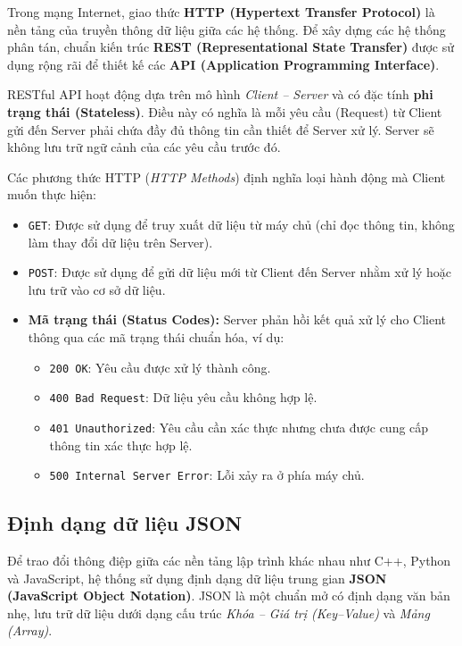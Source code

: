 \documentclass[12pt,a4paper]{report}
\begin{document}
Trong mạng Internet, giao thức \textbf{HTTP (Hypertext Transfer Protocol)} là nền tảng của truyền thông dữ liệu giữa các hệ thống. 
Để xây dựng các hệ thống phân tán, chuẩn kiến trúc \textbf{REST (Representational State Transfer)} được sử dụng rộng rãi để thiết kế các \textbf{API (Application Programming Interface)}.

RESTful API hoạt động dựa trên mô hình \textit{Client -- Server} và có đặc tính \textbf{phi trạng thái (Stateless)}. 
Điều này có nghĩa là mỗi yêu cầu (Request) từ Client gửi đến Server phải chứa đầy đủ thông tin cần thiết để Server xử lý. 
Server sẽ không lưu trữ ngữ cảnh của các yêu cầu trước đó.

Các phương thức HTTP (\textit{HTTP Methods}) định nghĩa loại hành động mà Client muốn thực hiện:

\begin{itemize}

\item \texttt{GET}: 
Được sử dụng để truy xuất dữ liệu từ máy chủ (chỉ đọc thông tin, không làm thay đổi dữ liệu trên Server).

\item \texttt{POST}: 
Được sử dụng để gửi dữ liệu mới từ Client đến Server nhằm xử lý hoặc lưu trữ vào cơ sở dữ liệu.

\item \textbf{Mã trạng thái (Status Codes):} 
Server phản hồi kết quả xử lý cho Client thông qua các mã trạng thái chuẩn hóa, ví dụ:

\begin{itemize}
\item \texttt{200 OK}: Yêu cầu được xử lý thành công.
\item \texttt{400 Bad Request}: Dữ liệu yêu cầu không hợp lệ.
\item \texttt{401 Unauthorized}: Yêu cầu cần xác thực nhưng chưa được cung cấp thông tin xác thực hợp lệ.
\item \texttt{500 Internal Server Error}: Lỗi xảy ra ở phía máy chủ.
\end{itemize}

\end{itemize}

\subsection{Định dạng dữ liệu JSON}

Để trao đổi thông điệp giữa các nền tảng lập trình khác nhau như C++, Python và JavaScript, hệ thống sử dụng định dạng dữ liệu trung gian \textbf{JSON (JavaScript Object Notation)}. JSON là một chuẩn mở có định dạng văn bản nhẹ, lưu trữ dữ liệu dưới dạng cấu trúc \textit{Khóa -- Giá trị (Key--Value)} và \textit{Mảng (Array)}.
\end{document}
